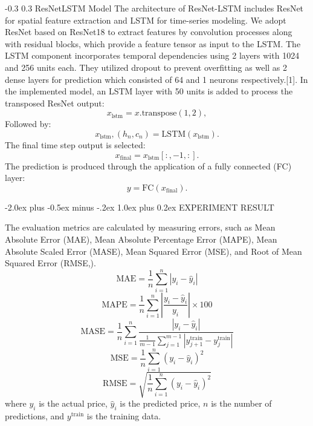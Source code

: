 \documentclass[twocolumn]{llncs}
\makeatletter
\renewcommand{\section}{\@startsection{section}{1}{\z@}%
  {-2.0ex plus -0.5ex minus -.2ex}%
  {1.0ex plus 0.2ex}%
  {\centering\normalfont\normalsize\bfseries}}
\renewcommand{\subsection}{\@startsection{subsection}{2}{\z@}%
  {-0.3\baselineskip}  %
  {0.3\baselineskip}   %
  {\normalfont\normalsize\bfseries}}
\makeatother
\begin{document}
\subsection{ResNetLSTM Model}
The architecture of ResNet-LSTM includes ResNet for spatial feature extraction and LSTM for time-series modeling. We adopt ResNet based on ResNet18 to extract features by convolution processes along with residual blocks, which provide a feature tensor as input to the LSTM. The LSTM component incorporates temporal dependencies using 2 layers with 1024 and 256 units each. They utilized dropout to prevent overfitting as well as 2 dense layers for prediction which consisted of 64 and 1 neurons respectively.[1]. In the implemented model, an LSTM layer with 50 units is added to process the transposed ResNet output:
\begin{equation}
x_{\text{lstm}} = x.\text{transpose}(1, 2), \label{eq:transpose}
\end{equation}
Followed by:
\begin{equation}
x_{\text{lstm}}, (h_n, c_n) = \text{LSTM}(x_{\text{lstm}}). \label{eq:lstm}
\end{equation}
The final time step output is selected:
\begin{equation}
x_{\text{final}} = x_{\text{lstm}}[:, -1, :]. \label{eq:final}
\end{equation}
The prediction is produced through the application of a fully connected (FC) layer:
\begin{equation}
y = \text{FC}(x_{\text{final}}). \label{eq:output}
\end{equation}


\section{EXPERIMENT RESULT}

The evaluation metrics are calculated by measuring errors, such as Mean Absolute Error (MAE), Mean Absolute Percentage Error (MAPE), Mean Absolute Scaled Error (MASE), Mean Squared Error (MSE), and Root of Mean Squared Error (RMSE,).
\[
\text{MAE} = \frac{1}{n} \sum_{i=1}^n |y_i - \hat{y}_i|
\]
\[
\text{MAPE} = \frac{1}{n} \sum_{i=1}^n \left| \frac{y_i - \hat{y}_i}{y_i} \right| \times 100
\]
\[
\text{MASE} = \frac{1}{n} \sum_{i=1}^n \frac{|y_i - \hat{y}_i|}{\frac{1}{m-1} \sum_{j=1}^{m-1} |y_{j+1}^{\text{train}} - y_j^{\text{train}}|}
\]
\[
\text{MSE} = \frac{1}{n} \sum_{i=1}^n (y_i - \hat{y}_i)^2
\]
\[
\text{RMSE} = \sqrt{\frac{1}{n} \sum_{i=1}^n (y_i - \hat{y}_i)^2}
\]
where \( y_i \) is the actual price, \( \hat{y}_i \) is the predicted price, \( n \) is the number of predictions, and \( y^{\text{train}} \) is the training data.
\end{document}
